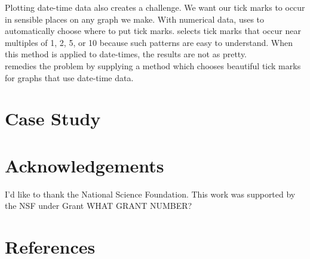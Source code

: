 \documentclass[article]{jss}
\begin{document}
Plotting date-time data also creates a challenge. We want our tick marks to occur in sensible places on any graph we make. With numerical data,  uses  to automatically choose where to put tick marks.  selects tick marks that occur near multiples of 1, 2, 5, or 10 because such patterns are easy to understand. When this method is applied to date-times, the results are not as pretty.\\

 remedies the problem by supplying a  method which chooses beautiful tick marks for graphs that use date-time data. 




\section{Case Study}

\section*{Acknowledgements}
I'd like to thank the National Science Foundation. This work was supported by the NSF under Grant WHAT GRANT NUMBER? 

\section*{References}
\end{document}
